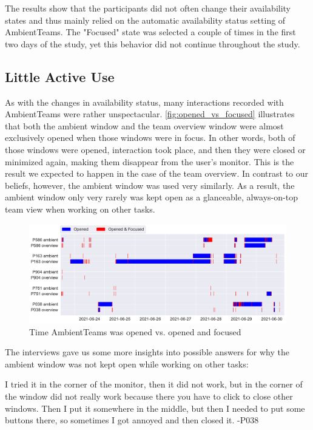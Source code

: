The results show that the participants did not often change their availability states and thus mainly relied on the automatic availability status setting of AmbientTeams. The "Focused" state was selected a couple of times in the first two days of the study, yet this behavior did not continue throughout the study.


\subsection{Little Active Use}
As with the changes in availability status, many interactions recorded with AmbientTeams were rather unspectacular. \autoref{fig:opened_vs_focused} illustrates that both the ambient window and the team overview window were almost exclusively opened when those windows were in focus. In other words, both of those windows were opened, interaction took place, and then they were closed or minimized again, making them disappear from the user's monitor. This is the result we expected to happen in the case of the team overview. In contrast to our beliefs, however, the ambient window was used very similarly. As a result, the ambient window only very rarely was kept open as a glanceable, always-on-top team view when working on other tasks.

\begin{figure}[h]
    \centering
    \includegraphics[width=\linewidth]{plots/open_vs_focus.pdf}
    \caption{Time AmbientTeams was opened vs. opened and focused}
    \label{fig:opened_vs_focused}
\end{figure}

The interviews gave us some more insights into possible answers for why the ambient window was not kept open while working on other tasks:

\begin{displayquote}
    I tried it in the corner of the monitor, then it did not work, but in the corner of the window did not really work because there you have to click to close other windows. Then I put it somewhere in the middle, but then I needed to put some buttons there, so sometimes I got annoyed and then closed it. -P038
\end{displayquote}

